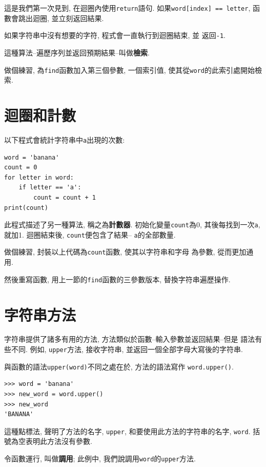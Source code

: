 \documentclass[10pt]{book}
\begin{document}
這是我們第一次見到, 在迴圈內使用{\tt return}語句. 
如果{\tt word[index] == letter}, 函數會跳出迴圈, 並立刻返回結果. 

如果字符串中沒有想要的字符, 程式會一直執行到迴圈結束, 並
返回{\tt -1}.

這種算法--遍歷序列並返回預期結果--叫做{\bf 檢索}. 

做個練習, 為{\tt find}函數加入第三個參數, 一個索引值, 
使其從{\tt word}的此索引處開始檢索.


\section{迴圈和計數}
\label{counter}
以下程式會統計字符串中{\tt a}出現的次數:

\begin{verbatim}
word = 'banana'
count = 0
for letter in word:
    if letter == 'a':
        count = count + 1
print(count)
\end{verbatim}
%
此程式描述了另一種算法, 稱之為{\bf 計數器}.
初始化變量{\tt count}為0, 其後每找到一次{\tt a}, 就加1.
迴圈結束後,  {\tt count}便包含了結果-- {\tt a}的全部數量.

做個練習, 封裝以上代碼為{\tt count}函數, 使其以字符串和字母
為參數, 從而更加通用. 

然後重寫函數, 用上一節的{\tt find}函數的三參數版本, 替換字符串遍歷操作. 


\section{字符串方法}
\label{optional}
字符串提供了諸多有用的方法, 方法類似於函數--輸入參數並返回結果--但是
語法有些不同. 
例如, {\tt upper}方法, 接收字符串, 
並返回一個全部字母大寫後的字符串. 

與函數的語法{\tt upper(word)}不同之處在於, 
方法的語法寫作 {\tt word.upper()}.

\begin{verbatim}
>>> word = 'banana'
>>> new_word = word.upper()
>>> new_word
'BANANA'
\end{verbatim}
%
這種點標法, 聲明了方法的名字, {\tt upper}, 
和要使用此方法的字符串的名字, {\tt word}. 
括號為空表明此方法沒有參數. 

令函數運行, 叫做{\bf 調用};
此例中, 我們說調用{\tt word}的{\tt upper}方法. 
\end{document}
